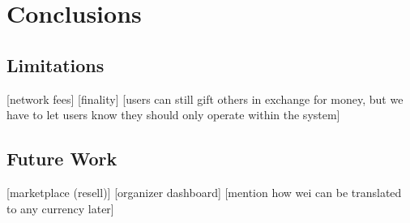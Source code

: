 \chapter{Conclusions}
\label{ch:conclusions}

\section{Limitations}
 [network fees]
 [finality]
 [users can still gift others in exchange for money, but we have to let users know they should only operate within the system]

\section{Future Work}

 [marketplace (resell)]
 [organizer dashboard]
 [mention how wei can be translated to any currency later]